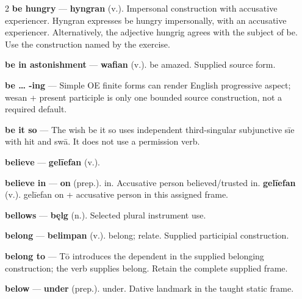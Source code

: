 \begin{multicols}{2}
\textbf{be hungry} — \textbf{hyngran} (v.). Impersonal construction with accusative experiencer. Hyngran expresses be hungry impersonally, with an accusative experiencer. Alternatively, the adjective hungrig agrees with the subject of be. Use the construction named by the exercise.\par
\textbf{be in astonishment} — \textbf{wafian} (v.). be amazed. Supplied source form.\par
\textbf{be … -ing} — Simple OE finite forms can render English progressive aspect; wesan + present participle is only one bounded source construction, not a required default.\par
\textbf{be it so} — The wish be it so uses independent third-singular subjunctive sīe with hit and swā. It does not use a permission verb.\par
\textbf{believe} — \textbf{gelīefan} (v.).\par
\textbf{believe in} — \textbf{on} (prep.). in. Accusative person believed/trusted in. \textbf{gelīefan} (v.). gelīefan on + accusative person in this assigned frame.\par
\textbf{bellows} — \textbf{bęlg} (n.). Selected plural instrument use.\par
\textbf{belong} — \textbf{belimpan} (v.). belong; relate. Supplied participial construction.\par
\textbf{belong to} — Tō introduces the dependent in the supplied belonging construction; the verb supplies belong. Retain the complete supplied frame.\par
\textbf{below} — \textbf{under} (prep.). under. Dative landmark in the taught static frame.\par

\end{multicols}
